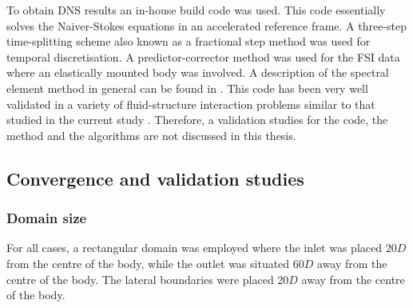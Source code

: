  To obtain DNS results an in-house build code was used. This code essentially solves the Naiver-Stokes equations in an accelerated reference frame. A three-step time-splitting scheme also known as a fractional step method was used for temporal discretisation. A predictor-corrector method was used for the FSI data where an elastically mounted body was involved. A description of the spectral element method in general can be found in \citet{karniadakis2005}. This code has been very well validated in a variety of fluid-structure interaction problems similar to that studied in the current study \citep{Leontini2007a,Griffith2011,Leontini2011,Leontini2013}. Therefore, a validation studies for the code, the method and the algorithms are not discussed in this thesis. 
 
\subsection{Convergence and validation studies}

\subsubsection{Domain size}

 For all cases, a rectangular domain was employed where the inlet was placed $20D$ from the centre of the body, while the outlet was situated $60D$ away from the centre of the body. The lateral boundaries were placed $20D$ away from the centre of the body.


















